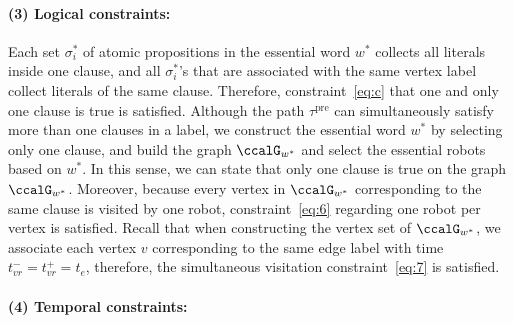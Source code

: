 \documentclass[Afour,sageh,times]{sagej}
\begin{document}
{\paragraph{(3) Logical constraints:} Each set $\sigma^*_i$ of atomic propositions in the essential word $w^*$ collects all literals inside one clause, and all $\sigma^*_i$'s that are associated with the same vertex label collect literals of the same clause. Therefore, constraint~\eqref{eq:c} that one and only one clause is true is satisfied. Although the path $\tau^\text{pre}$ can simultaneously satisfy more than one clauses in a label, we construct the essential word $w^*$ by selecting only one clause, and build the graph $\ccalG_{w^*}$ and select the essential robots based on $w^*$. In this sense, we can state that only one clause is true on the graph $\ccalG_{w^*}$. Moreover, because every vertex in $\ccalG_{w^*}$ corresponding to the same clause is visited by one robot, constraint~\eqref{eq:6} regarding one robot per vertex is satisfied. Recall that when constructing the vertex set of $\ccalG_{w^*}$, we associate each vertex $v$ corresponding to the same edge label with time $t_{vr}^- = t_{vr}^+ = t_e$, therefore, the simultaneous visitation constraint~\eqref{eq:7} is satisfied.

\paragraph{(4) Temporal constraints:}
}
\end{document}
